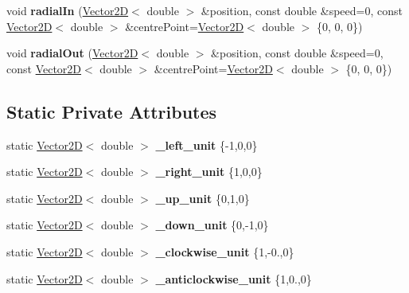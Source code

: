 \begin{DoxyCompactItemize}
\item 
\mbox{\label{class_movable_object_a96d7fef6420a2cbd96a55898fc61d476}} 
void {\bfseries radial\+In} (\hyperlink{class_vector2_d}{Vector2D}$<$ double $>$ \&position, const double \&speed=0, const \hyperlink{class_vector2_d}{Vector2D}$<$ double $>$ \&centre\+Point=\hyperlink{class_vector2_d}{Vector2D}$<$ double $>$ \{0, 0, 0\})
\item 
\mbox{\label{class_movable_object_aa0dd37ccd33ed6ef2f6f938f3aa9a9fc}} 
void {\bfseries radial\+Out} (\hyperlink{class_vector2_d}{Vector2D}$<$ double $>$ \&position, const double \&speed=0, const \hyperlink{class_vector2_d}{Vector2D}$<$ double $>$ \&centre\+Point=\hyperlink{class_vector2_d}{Vector2D}$<$ double $>$ \{0, 0, 0\})
\end{DoxyCompactItemize}
\subsection*{Static Private Attributes}
\begin{DoxyCompactItemize}
\item 
\mbox{\label{class_movable_object_aff4ab97c1a04e0f7855e7334e8a09332}} 
static \hyperlink{class_vector2_d}{Vector2D}$<$ double $>$ {\bfseries \+\_\+left\+\_\+unit} \{-\/1,0,0\}
\item 
\mbox{\label{class_movable_object_a451ae33fe3649da0f192a0cfd07b5483}} 
static \hyperlink{class_vector2_d}{Vector2D}$<$ double $>$ {\bfseries \+\_\+right\+\_\+unit} \{1,0,0\}
\item 
\mbox{\label{class_movable_object_a75b6b65f001009a86f3539328cd78796}} 
static \hyperlink{class_vector2_d}{Vector2D}$<$ double $>$ {\bfseries \+\_\+up\+\_\+unit} \{0,1,0\}
\item 
\mbox{\label{class_movable_object_a3f28463dbdf49e29c7e6dbdd48cb575a}} 
static \hyperlink{class_vector2_d}{Vector2D}$<$ double $>$ {\bfseries \+\_\+down\+\_\+unit} \{0,-\/1,0\}
\item 
\mbox{\label{class_movable_object_a0a44340656b24bea268091cf20ba3adf}} 
static \hyperlink{class_vector2_d}{Vector2D}$<$ double $>$ {\bfseries \+\_\+clockwise\+\_\+unit} \{1,-\/0.,0\}
\item 
\mbox{\label{class_movable_object_a72e83f4b71b923c82ae8b1c8585caf0e}} 
static \hyperlink{class_vector2_d}{Vector2D}$<$ double $>$ {\bfseries \+\_\+anticlockwise\+\_\+unit} \{1,0.,0\}
\end{DoxyCompactItemize}


